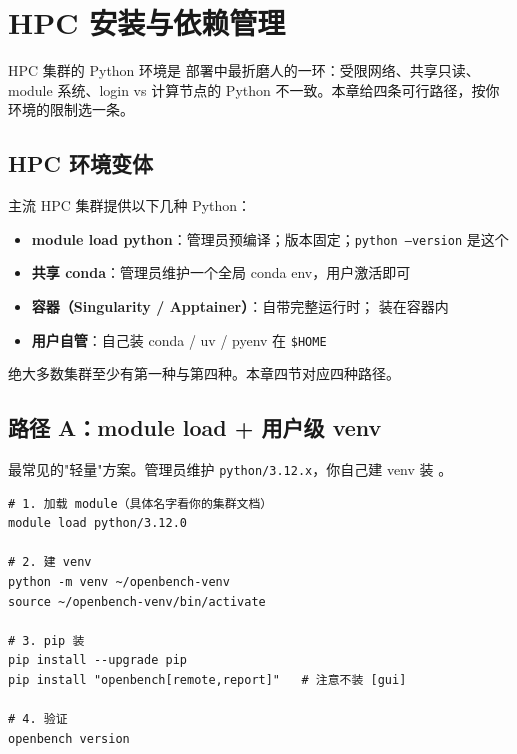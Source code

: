 
\chapter{HPC 安装与依赖管理}

HPC 集群的 Python 环境是 \openbench{} 部署中最折磨人的一环：受限网络、共享只读、module 系统、login vs 计算节点的 Python 不一致。本章给四条可行路径，按你环境的限制选一条。

\section{HPC 环境变体}

主流 HPC 集群提供以下几种 Python：

\begin{itemize}
  \item \textbf{module load python}：管理员预编译；版本固定；\texttt{python --version} 是这个
  \item \textbf{共享 conda}：管理员维护一个全局 conda env，用户激活即可
  \item \textbf{容器（Singularity / Apptainer）}：自带完整运行时；\openbench{} 装在容器内
  \item \textbf{用户自管}：自己装 conda / uv / pyenv 在 \texttt{\$HOME}
\end{itemize}

绝大多数集群至少有第一种与第四种。本章四节对应四种路径。

\section{路径 A：module load + 用户级 venv}

最常见的"轻量"方案。管理员维护 \texttt{python/3.12.x}，你自己建 venv 装 \openbench{}。

\begin{verbatim}
# 1. 加载 module（具体名字看你的集群文档）
module load python/3.12.0

# 2. 建 venv
python -m venv ~/openbench-venv
source ~/openbench-venv/bin/activate

# 3. pip 装
pip install --upgrade pip
pip install "openbench[remote,report]"   # 注意不装 [gui]

# 4. 验证
openbench version
\end{verbatim}


